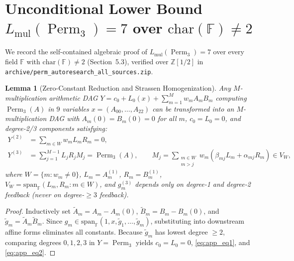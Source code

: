 \documentclass[11pt,a4paper]{article}
\newtheorem{lemma}[theorem]{Lemma}
\newcommand{\Perm}{\operatorname{Perm}}
\newcommand{\F}{\mathbb{F}}
\begin{document}
\appendix

\section{Unconditional Lower Bound $L_{\mathrm{mul}}(\Perm_3) = 7$ over $\mathrm{char}(\F) \neq 2$}
\label{app:perm3_lower}

We record the self-contained algebraic proof of $L_{\mathrm{mul}}(\Perm_3) = 7$ over every field $\F$ with $\mathrm{char}(\F) \neq 2$ (Section~5.3), verified over $\mathbb{Z}[1/2]$ in \texttt{archive/perm\_\-autoresearch\_\-all\_\-sources.zip}.

\begin{lemma}[Zero-Constant Reduction and Strassen Homogenization]
Any $M$-multiplication arithmetic DAG $Y = c_0 + L_0(x) + \sum_{m=1}^M w_m A_m B_m$ computing $\Perm_3(A)$ in $9$ variables $x = (A_{00},\dots,A_{22})$ can be transformed into an $M$-multiplication DAG with $A_m(0) = B_m(0) = 0$ for all $m$, $c_0 = L_0 = 0$, and degree-2/3 components satisfying:
\begin{align}
  Y^{(2)} &= \sum_{m \in W} w_m L_m R_m = 0, \label{eq:app_eq1} \\
  Y^{(3)} &= \sum_{j=1}^{M-1} L_j R_j M_j = \Perm_3(A), \qquad M_j = \sum_{\substack{m \in W \\ m > j}} w_m (\beta_{mj} L_m + \alpha_{mj} R_m) \in V_W, \label{eq:app_eq2}
\end{align}
where $W = \{m : w_m \neq 0\}$, $L_m = A_m^{(1)}$, $R_m = B_m^{(1)}$, $V_W = \mathrm{span}_{\F}(L_m, R_m : m \in W)$, and $g_m^{(3)}$ depends only on degree-1 and degree-2 feedback (never on degree-$\ge 3$ feedback).
\end{lemma}
\begin{proof}
Inductively set $\tilde{A}_m = A_m - A_m(0)$, $\tilde{B}_m = B_m - B_m(0)$, and $\tilde{g}_m = \tilde{A}_m \tilde{B}_m$. Since $g_m \in \mathrm{span}_{\F}(1, x, \tilde{g}_1,\dots,\tilde{g}_m)$, substituting into downstream affine forms eliminates all constants. Because $\tilde{g}_m$ has lowest degree $\ge 2$, comparing degrees $0, 1, 2, 3$ in $Y = \Perm_3$ yields $c_0 = L_0 = 0$, \eqref{eq:app_eq1}, and \eqref{eq:app_eq2}.
\end{proof}
\end{document}
